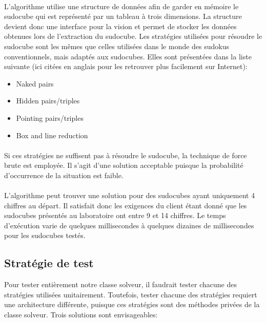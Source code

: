 \paragraph{}L'algorithme utilise une structure de données afin de garder en mémoire le sudocube qui est représenté par un tableau à trois dimensions. La structure devient donc une interface pour la vision et permet de stocker les données obtenues lors de l'extraction du sudocube.
Les stratégies utilisées pour résoudre le sudocube sont les mêmes que celles  utilisées dans le monde des sudokus conventionnels, mais adaptés aux sudocubes. Elles sont présentées dans la liste suivante (ici citées en anglais pour les retrouver plus facilement sur Internet):\newline
\begin{itemize}
\item Naked pairs
\item Hidden pairs/triples
\item Pointing pairs/triples
\item Box and line reduction
\end{itemize}
\paragraph{}Si ces stratégies ne suffisent pas à résoudre le sudocube, la technique de force brute est employée. Il s'agit d'une solution acceptable puisque la probabilité d’occurrence de la situation est faible.

\paragraph{}L'algorithme peut trouver une solution pour des sudocubes ayant uniquement 4 chiffres au départ. Il satisfait donc les exigences du client étant donné que les sudocubes présentés au laboratoire ont entre 9 et 14 chiffres. Le temps d'exécution varie de quelques millisecondes à quelques dizaines de millisecondes pour les sudocubes testés.

\subsection{Stratégie de test}
Pour tester entièrement notre classe solveur, il faudrait tester chacune des stratégies utilisées unitairement. Toutefois, tester chacune des stratégies requiert une architecture différente, puisque ces stratégies sont des méthodes privées de la classe solveur. Trois solutions sont envisageables:

